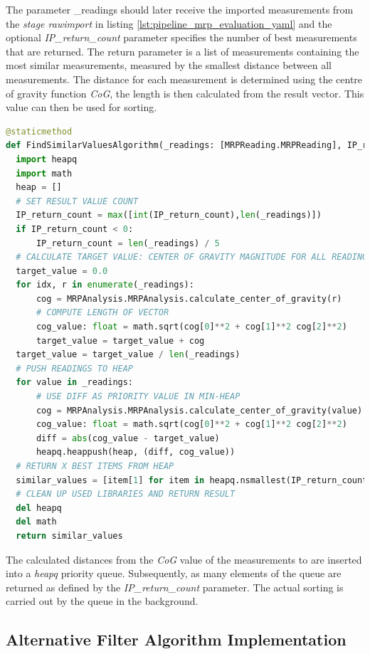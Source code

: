 The parameter \_readings should later receive the imported measurements
from the \emph{stage rawimport} in listing
\ref{lst:pipeline_mrp_evaluation_yaml} and the optional
\emph{IP\_return\_count} parameter specifies the number of best
measurements that are returned. The return parameter is a list of
measurements containing the most similar measurements, measured by the
smallest distance between all measurements. The distance for each
measurement is determined using the centre of gravity function
\emph{CoG}, the length is then calculated from the result vector. This
value can then be used for sorting.

\begin{lstlisting}[language=Python, caption={User implemented custom find most similar readings algorithm}, label=lst:custom_find_similar_values_algorithm]
@staticmethod
def FindSimilarValuesAlgorithm(_readings: [MRPReading.MRPReading], IP_return_count: int = -1) -> [MRPReading.MRPReading]:
  import heapq
  import math
  heap = []
  # SET RESULT VALUE COUNT
  IP_return_count = max([int(IP_return_count),len(_readings)])
  if IP_return_count < 0:
      IP_return_count = len(_readings) / 5
  # CALCULATE TARGET VALUE: CENTER OF GRAVITY MAGNITUDE FOR ALL READINGS
  target_value = 0.0
  for idx, r in enumerate(_readings):
      cog = MRPAnalysis.MRPAnalysis.calculate_center_of_gravity(r)
      # COMPUTE LENGTH OF VECTOR
      cog_value: float = math.sqrt(cog[0]**2 + cog[1]**2 cog[2]**2)
      target_value = target_value + cog
  target_value = target_value / len(_readings)
  # PUSH READINGS TO HEAP
  for value in _readings:
      # USE DIFF AS PRIORITY VALUE IN MIN-HEAP
      cog = MRPAnalysis.MRPAnalysis.calculate_center_of_gravity(value)
      cog_value: float = math.sqrt(cog[0]**2 + cog[1]**2 cog[2]**2)
      diff = abs(cog_value - target_value)
      heapq.heappush(heap, (diff, cog_value))
  # RETURN X BEST ITEMS FROM HEAP
  similar_values = [item[1] for item in heapq.nsmallest(IP_return_count, heap)]
  # CLEAN UP USED LIBRARIES AND RETURN RESULT
  del heapq
  del math
  return similar_values
\end{lstlisting}

The calculated distances from the \emph{CoG} value of the measurements
to are inserted into a \emph{heapq} priority queue. Subsequently, as
many elements of the queue are returned as defined by the
\emph{IP\_return\_count} parameter. The actual sorting is carried out by
the queue in the background.

\hypertarget{alternative-filter-algorithm-implementation}{%
\subsection{Alternative Filter Algorithm
Implementation}\label{alternative-filter-algorithm-implementation}}

